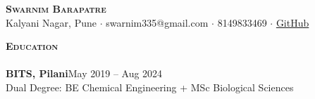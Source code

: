 \documentclass[a4paper]{article}
\newcommand{\lineunder} {
\vspace*{-8pt} \\
\hspace*{-18pt} \hrulefill \\
}
\newcommand{\header}[1]{%
{\hspace*{-18pt}\vspace*{6pt} \textsc{\textbf{\Large{#1}}}}%
\vspace*{-6pt} \lineunder
}
\begin{document}
\vspace*{-40pt}

\vspace*{-10pt}
\begin{center}
{\Huge \scshape \textbf {Swarnim Barapatre}}\\
Kalyani Nagar, Pune $\cdot$ swarnim335@gmail.com $\cdot$ 8149833469 $\cdot$ \href{https://github.com/swarnimcodes/}{GitHub} \\ %
\end{center}

\header{Education}

{\textbf{BITS, Pilani}}\hfill May 2019 -- Aug 2024\\
Dual Degree: BE Chemical Engineering + MSc Biological Sciences %

\vspace{4mm}
\end{document}
